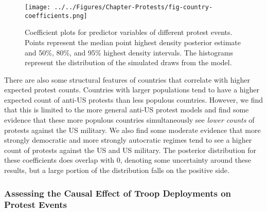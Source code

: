 			
			\begin{figure}[t]
				\centering\texttt{[image: ../../Figures/Chapter-Protests/fig-country-coefficients.png]}
				\caption{Coefficient plots for predictor variables of different protest events. Points represent the median point highest density posterior estimate and 50\%, 80\%, and 95\% highest density intervals. The histograms represent the distribution of the simulated draws from the model.}
				\label{fig:coefplotcountryprotestmodels}
			\end{figure}
			
			There are also some structural features of countries that correlate with higher expected protest counts. Countries with larger populations tend to have a higher expected count of anti-US protests than less populous countries. However, we find that this is limited to the more general anti-US protest models and find some evidence that these more populous countries simultaneously see \textit{lower counts} of protests against the US military. We also find some moderate evidence that more strongly democratic and more strongly autocratic regimes tend to see a higher count of protests against the US and US military. The posterior distribution for these coefficients does overlap with 0, denoting some uncertainty around these results, but a large portion of the distribution falls on the positive side. 
			
			\subsubsection{Assessing the Causal Effect of Troop Deployments on Protest Events}
			
